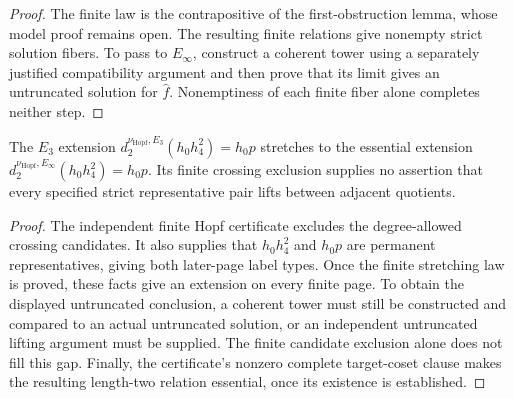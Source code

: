 \begin{proof}
  The finite law is the contrapositive of the first-obstruction lemma,
  whose model proof remains open.  The resulting finite relations give
  nonempty strict solution fibers.  To pass to $E_\infty$, construct a
  coherent tower using a separately justified compatibility argument and
  then prove that its limit gives an untruncated solution for $\widehat f$.
  Nonemptiness of each finite fiber alone completes neither step.
\end{proof}

\begin{proposition}
  \label{prop:page-stretch-regression}
  \notready
  The $E_3$ extension
  $d_2^{\nu_{\mathrm{Hopf}},E_3}(h_0h_4^2)=h_0p$ stretches to the
  essential extension
  $d_2^{\nu_{\mathrm{Hopf}},E_\infty}(h_0h_4^2)=h_0p$.
  Its finite crossing exclusion supplies no assertion that every specified
  strict representative pair lifts between adjacent quotients.
\end{proposition}

\begin{proof}
  The independent finite Hopf certificate excludes the degree-allowed
  crossing candidates.  It also supplies that $h_0h_4^2$ and $h_0p$ are
  permanent representatives, giving both later-page label types.
  Once the finite stretching law is proved, these facts give an extension
  on every finite page.  To obtain the displayed untruncated conclusion,
  a coherent tower must still be constructed and compared to an actual
  untruncated solution, or an independent untruncated lifting argument
  must be supplied.  The finite candidate exclusion alone does not fill
  this gap.  Finally, the certificate's nonzero complete target-coset
  clause makes the resulting length-two relation essential, once its
  existence is established.
\end{proof}

